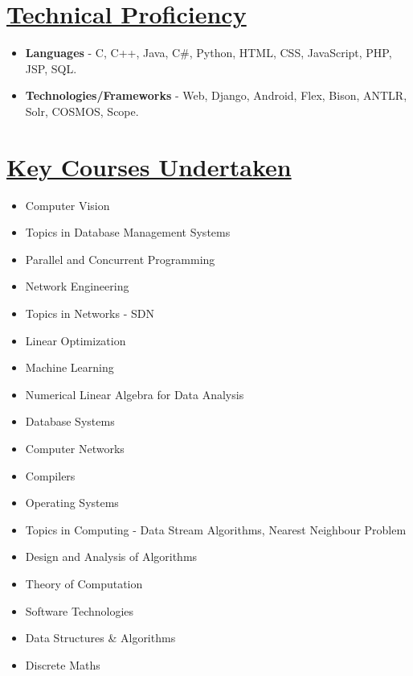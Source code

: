 \documentclass[9pt]{extarticle}
\newcommand{\heading}[1]{
\section*{\color{red}\underline{#1}}
}
\begin{document}
\heading{Technical Proficiency}
\begin{itemize}
\item \textbf{Languages} - C, C++, Java, C\#, Python, HTML, CSS, JavaScript, PHP, JSP, SQL.
\item \textbf{Technologies/Frameworks} - Web, Django, Android, Flex, Bison, ANTLR, Solr, COSMOS, Scope.
\end{itemize}

\heading{Key Courses Undertaken}
\begin{multicols}{2}
\begin{itemize}
\item Computer Vision
\item Topics in Database Management Systems
\item Parallel and Concurrent Programming
\item Network Engineering
\item Topics in Networks - SDN
\item Linear Optimization
\item Machine Learning
\item Numerical Linear Algebra for Data Analysis
\item Database Systems
\item Computer Networks
\item Compilers
\item Operating Systems
\item Topics in Computing - Data Stream Algorithms, Nearest Neighbour Problem
\item Design and Analysis of Algorithms
\item Theory of Computation
\item Software Technologies
\item Data Structures \& Algorithms
\item Discrete Maths
\end{itemize}
\end{multicols}
\end{document}
